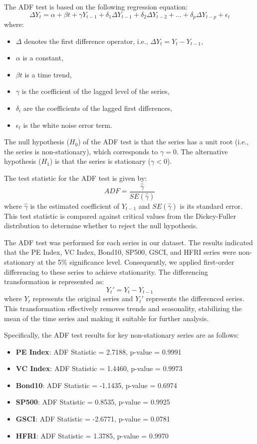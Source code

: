 \documentclass[12pt]{article}
\begin{document}
The ADF test is based on the following regression equation:
\[
\Delta Y_t = \alpha + \beta t + \gamma Y_{t-1} + \delta_1 \Delta Y_{t-1} + \delta_2 \Delta Y_{t-2} + \ldots + \delta_p \Delta Y_{t-p} + \epsilon_t
\]
where:
\begin{itemize}
    \item \(\Delta\) denotes the first difference operator, i.e., \(\Delta Y_t = Y_t - Y_{t-1}\),
    \item \(\alpha\) is a constant,
    \item \(\beta t\) is a time trend,
    \item \(\gamma\) is the coefficient of the lagged level of the series,
    \item \(\delta_i\) are the coefficients of the lagged first differences,
    \item \(\epsilon_t\) is the white noise error term.
\end{itemize}

The null hypothesis (\(H_0\)) of the ADF test is that the series has a unit root (i.e., the series is non-stationary), which corresponds to \(\gamma = 0\). The alternative hypothesis (\(H_1\)) is that the series is stationary (\(\gamma < 0\)).

The test statistic for the ADF test is given by:
\[
ADF = \frac{\hat{\gamma}}{SE(\hat{\gamma})}
\]
where \(\hat{\gamma}\) is the estimated coefficient of \(Y_{t-1}\) and \(SE(\hat{\gamma})\) is its standard error. This test statistic is compared against critical values from the Dickey-Fuller distribution to determine whether to reject the null hypothesis.

The ADF test was performed for each series in our dataset. The results indicated that the PE Index, VC Index, Bond10, SP500, GSCI, and HFRI series were non-stationary at the 5\% significance level. Consequently, we applied first-order differencing to these series to achieve stationarity. The differencing transformation is represented as:
\[
Y_t' = Y_t - Y_{t-1}
\]
where \(Y_t\) represents the original series and \(Y_t'\) represents the differenced series. This transformation effectively removes trends and seasonality, stabilizing the mean of the time series and making it suitable for further analysis.

Specifically, the ADF test results for key non-stationary series are as follows:

\begin{itemize}
    \item \textbf{PE Index}: ADF Statistic = 2.7188, p-value = 0.9991
    \item \textbf{VC Index}: ADF Statistic = 1.4460, p-value = 0.9973
    \item \textbf{Bond10}: ADF Statistic = -1.1435, p-value = 0.6974
    \item \textbf{SP500}: ADF Statistic = 0.8535, p-value = 0.9925
    \item \textbf{GSCI}: ADF Statistic = -2.6771, p-value = 0.0781
    \item \textbf{HFRI}: ADF Statistic = 1.3785, p-value = 0.9970
\end{itemize}
\end{document}
